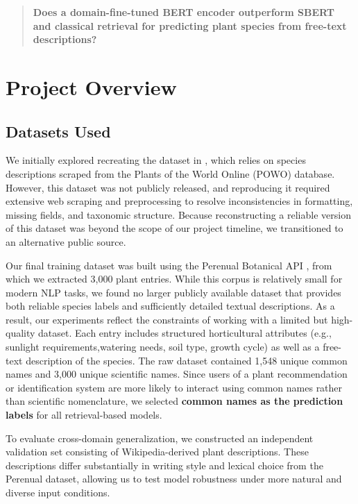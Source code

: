 \documentclass[11pt]{article}
\begin{document}
\begin{quote}
\textbf{Does a domain-fine-tuned BERT encoder outperform SBERT and classical retrieval for predicting plant species from free-text descriptions?}
\end{quote}

\section{Project Overview}

\subsection{Datasets Used}
We initially explored recreating the dataset in
\cite{domazetoski2025planttraits},
which relies on species descriptions scraped from the Plants of the World Online (POWO)
database. However, this dataset was not publicly released, and reproducing it required
extensive web scraping and preprocessing to resolve inconsistencies in formatting, missing
fields, and taxonomic structure. Because reconstructing a reliable version of this dataset
was beyond the scope of our project timeline, we transitioned to an alternative public source.


Our final training dataset was built using the Perenual Botanical API
\cite{perenualAPI}, from which we extracted 3{,}000 plant entries. While this corpus is relatively small for modern NLP tasks, we found no larger publicly available dataset that provides both reliable species labels and sufficiently detailed textual descriptions. As a result, our experiments reflect the constraints of working with a limited but high-quality dataset. Each entry includes structured horticultural attributes (e.g., sunlight requirements,watering needs, soil type, growth cycle) as well as a free-text description of the species. The raw dataset contained 1{,}548 unique common names and 3{,}000 unique scientific names.
Since users of a plant recommendation or identification system are more likely to interact
using common names rather than scientific nomenclature, we selected \textbf{common names
as the prediction labels} for all retrieval-based models.

To evaluate cross-domain generalization, we constructed an independent validation set
consisting of Wikipedia-derived plant descriptions. These descriptions differ substantially
in writing style and lexical choice from the Perenual dataset, allowing us to test model
robustness under more natural and diverse input conditions.
\end{document}
